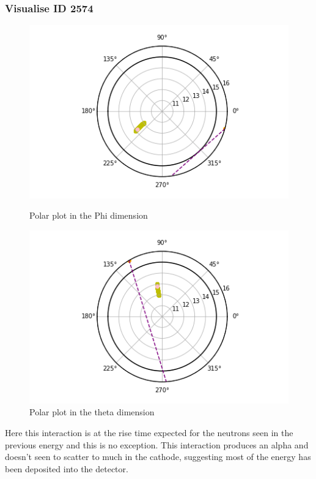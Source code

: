 \documentclass[a4paper]{article}
\begin{document}
\subsubsection{Visualise ID 2574}
\begin{figure}[H]
    \centering
    \begin{minipage}{.5\textwidth}
        \centering
        \includegraphics[width=1\linewidth]{Fast/2574_phi.png}
        \caption{Polar plot in the Phi dimension}
        \label{fig:prob1_6_2}
    \end{minipage}%
    \begin{minipage}{0.5\textwidth}
        \centering
        \includegraphics[width=1\linewidth]{Fast/2574_theta.png}
        \caption{Polar plot in the theta dimension}
        \label{fig:prob1_6_1}
    \end{minipage}
\end{figure}
\noindent Here this interaction is at the rise time expected for the neutrons seen in the previous energy and this is no exception. This interaction produces an alpha and doesn't seen to scatter to much in the cathode, suggesting most of the energy has been deposited into the detector.
\end{document}
